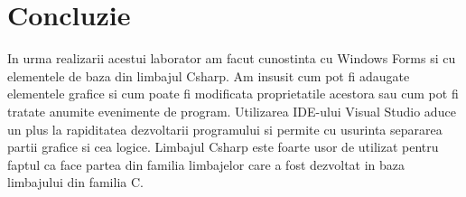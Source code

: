 \section*{Concluzie}
In urma realizarii acestui laborator am facut cunostinta cu Windows Forms si cu 
elementele de baza din limbajul Csharp. Am insusit cum pot fi adaugate elementele 
grafice si cum poate fi modificata proprietatile acestora sau cum pot fi tratate anumite 
evenimente de program. Utilizarea IDE-ului Visual Studio aduce un plus la rapiditatea 
dezvoltarii programului si permite cu usurinta separarea partii grafice si cea logice.
Limbajul Csharp este foarte usor de utilizat pentru faptul ca face partea din familia 
limbajelor care a fost dezvoltat in baza limbajului din familia C.

\clearpage